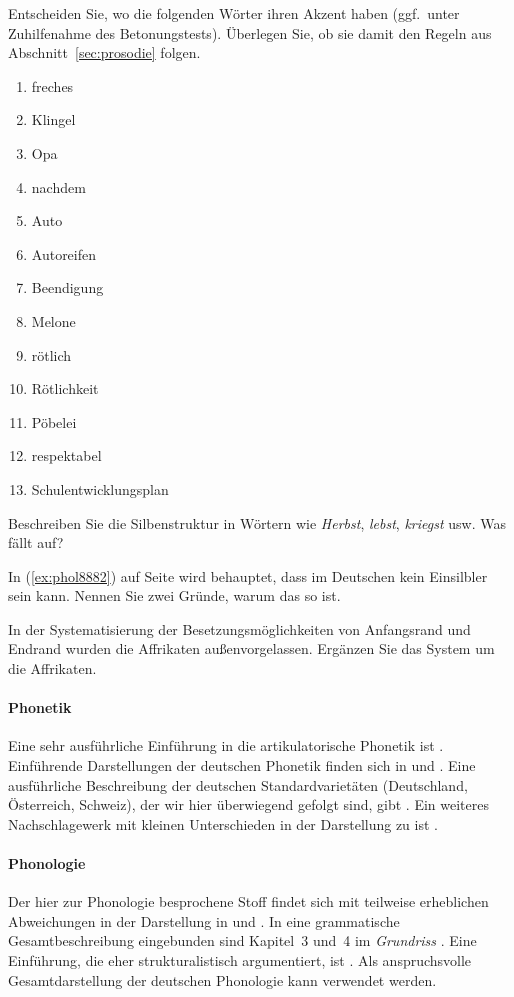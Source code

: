 \Uebung \label{u45} Entscheiden Sie, wo die folgenden Wörter ihren Akzent haben (ggf.\ unter Zuhilfenahme des Betonungstests).
Überlegen Sie, ob sie damit den Regeln aus Abschnitt~\ref{sec:prosodie} folgen.

\begin{enumerate}\Lf
  \item freches
  \item Klingel
  \item Opa
  \item nachdem
  \item Auto
  \item Autoreifen
  \item Beendigung
  \item Melone
  \item rötlich
  \item Rötlichkeit
  \item Pöbelei
  \item respektabel
  \item Schulentwicklungsplan
\end{enumerate}

\Uebung[\tristar] \label{u46} Beschreiben Sie die Silbenstruktur in Wörtern wie \textit{Herbst}, \textit{lebst}, \textit{kriegst} usw.
Was fällt auf?

\Uebung[\tristar] \label{u47} In (\ref{ex:phol8882}) auf Seite \pageref{ex:phol8882} wird behauptet, dass \textipa{[s5]} im Deutschen kein Einsilbler sein kann.
Nennen Sie zwei Gründe, warum das so ist.


\Uebung[\tristar] \label{u48} In der Systematisierung der Besetzungsmöglichkeiten von Anfangsrand und Endrand wurden die Affrikaten außenvorgelassen.
Ergänzen Sie das System um die Affrikaten.


\WeitereLiteratur

\paragraph*{Phonetik}

Eine sehr ausführliche Einführung in die artikulatorische Phonetik ist \citet{Laver94}.
Einführende Darstellungen der deutschen Phonetik finden sich \zB in \citet{RRKWS09} und \citet{Wiese10}.
Eine ausführliche Beschreibung der deutschen Standardvarietäten (Deutschland, Österreich, Schweiz), der wir hier überwiegend gefolgt sind, gibt \citet{Krech-ea2009}.
Ein weiteres Nachschlagewerk mit kleinen Unterschieden in der Darstellung zu \citealp{Krech-ea2009} ist \citet{Mangold06}.

\paragraph*{Phonologie}

\label{abs:pholliteratur}

Der hier zur Phonologie besprochene Stoff findet sich mit teilweise erheblichen Abweichungen in der Darstellung \zB in \citet{Hall00} und \citet{Wiese10}.
In eine grammatische Gesamtbeschreibung eingebunden sind Kapitel~3 und~4 im \textit{Grundriss} \citep{Eisenberg1}.
Eine Einführung, die eher strukturalistisch argumentiert, ist \citet{Ternes2012}.
Als anspruchsvolle Gesamtdarstellung der deutschen Phonologie kann \citet{Wiese00} verwendet werden.
